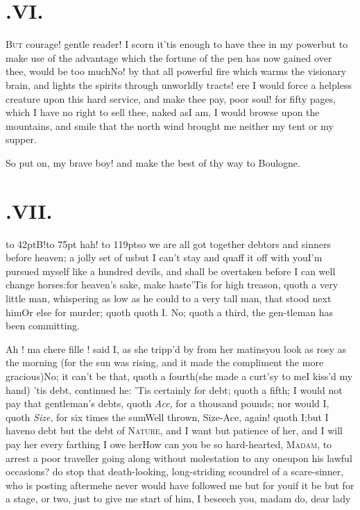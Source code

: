 \documentclass{article}
\begin{document}
\section{.\enspace VI.}

\lettrine{\Tsk B}{ut} courage! gentle
reader!\break
\tsh I scorn it\tsh ’tis enough\break
to have thee in my power\tsh but to make use of the advantage which the fortune of
the pen has now gained over thee, would be too much\tsh No\tsh !\break
by that all powerful fire which warms the visionary brain, and lights the spirits through
unworldly tracts! ere I would force a helpless creature upon this hard service, and
make thee pay, poor soul! for fifty pages, which I have no right to sell thee,\tsk
naked as\pb I am, I would browse upon the mountains, and smile that the north wind
brought me neither my tent or my supper.

\tsh So put on, my brave boy! and make the best of thy way to
Boulogne.

\newpage
\section{.\enspace VII.}

\lettrine{\hbox to 42pt{\Tsk B}}{}!\hbox to 75pt {\tsk hah!}\break
\hbox to 119pt{\tsk so we are all got together}\break
\tsh debtors and sinners before heaven;\break
a jolly
set of us\tsk but I can’t stay and quaff it off with
you\tsk I’m pursued myself like a hundred devils, and shall be
overtaken before I can well change horses:\tsh for heaven’s
sake, make haste\tsh ’Tis for high treason, quoth a very little
man, whispering as low as he could to a very tall man, that stood next
him\tsh Or else for murder; quoth\break
{}
quoth I. No; quoth a third, the gen-\break tleman has been committing\tsh\tsh.

\newpage
Ah ! ma chere fille ! said I, as she\break
tripp’d by from her matins\tsk you look as rosy as the morning (for the sun was
rising, and it made the compliment the more gracious)\tsh No; it can’t be that,\break
quoth a fourth\tsh (she made a
curt’sy to me\tsk I kiss’d my hand) ’tis
debt, continued he: ’Tis certainly for debt; quoth a
fifth; I would not pay that gentleman’s debts, quoth
\textit{Ace}, for a thousand pounds; nor would I, quoth \textit{Size},
for six times the sum\tsk Well thrown, Size-Ace, again!
quoth I;\tsk but I have\break no debt but the debt of
\textsc{Nature}, and I want but patience of her, and I will
pay her every farthing I owe her\tsh\break How can you be so
hard-hearted, \textsc{Ma\-dam}, to arrest a poor traveller going along without
molestation to any one\pb upon his lawful occasions? do stop that
death-looking, long-striding scoundrel of a scare-sinner, who is
posting after\break me\tsh he never would have followed me but
for you\tsh if it be but for a stage, or two, just to give
me start of him, I beseech you, madam\tsh\tsh\break
do, dear lady\tsh
\end{document}
